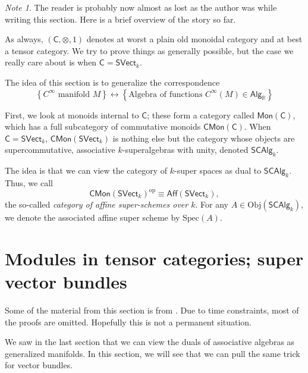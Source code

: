 \documentclass[a4paper,10pt]{scrreprt}
\newcommand{\R}{\mathbb{R}}
\newcommand{\Obj}{\mathrm{Obj}}
\newcommand{\Spec}{\mathrm{Spec}}
\theoremstyle{definition}
\theoremstyle{plain}
\theoremstyle{remark}
\newtheorem{note}{Note}[section]
\begin{document}
\begin{note}
  The reader is probably now almost as lost as the author was while writing this section. Here is a brief overview of the story so far.

  As always, $(\mathsf{C}, \otimes, 1)$ denotes at worst a plain old monoidal category and at best a tensor category. We try to prove things as generally possible, but the case we really care about is when $\mathsf{C} = \mathsf{SVect}_{k}$.

  The idea of this section is to generalize the correspondence 
  \begin{equation*}
    \left\{ \text{$C^{\infty}$ manifold $M$} \right\} \longleftrightarrow \left\{ \text{Algebra of functions $C^{\infty}(M) \in \mathsf{Alg}_{\R}$} \right\}
  \end{equation*}

  First, we look at monoids internal to $\mathsf{C}$; these form a category called $\mathsf{Mon}(\mathsf{C})$, which has a full subcategory of commutative monoids $\mathsf{CMon}(\mathsf{C})$. When $\mathsf{C} = \mathsf{SVect}_{k}$, $\mathsf{CMon}(\mathsf{SVect}_{k})$ is nothing else but the category whose objects are supercommutative, associative $k$-superalgebras with unity, denoted $\mathsf{SCAlg}_{k}$.

  The idea is that we can view the category of $k$-super spaces as dual to $\mathsf{SCAlg}_{k}$. Thus, we call 
  \begin{equation*}
    \mathsf{CMon}(\mathsf{SVect}_{k})^{\mathrm{op}} \equiv \mathsf{Aff}(\mathsf{SVect}_{k}),
  \end{equation*}
  the so-called \emph{category of affine super-schemes over $k$}. For any $A \in \Obj(\mathsf{SCAlg}_{k})$, we denote the associated affine super scheme by $\Spec(A)$.
\end{note}

\section{Modules in tensor categories; super vector bundles}
Some of the material from this section is from \cite{nestruev-smooth-manifolds-observables}. Due to time constraints, most of the proofs are omitted. Hopefully this is not a permanent situation.

We saw in the last section that we can view the duals of associative algebras as generalized manifolds. In this section, we will see that we can pull the same trick for vector bundles.
\end{document}
